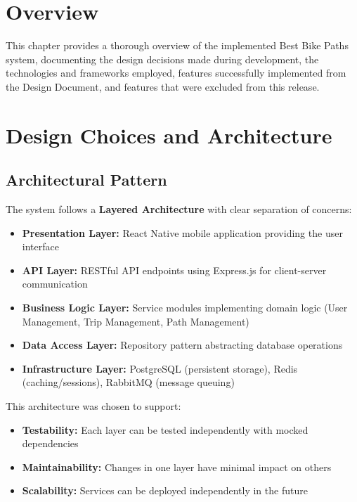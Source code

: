 \section{Overview}
\label{sec:system_implementation_overview}

This chapter provides a thorough overview of the implemented Best Bike Paths system, documenting the design decisions made during development, the technologies and frameworks employed, features successfully implemented from the Design Document, and features that were excluded from this release.

\section{Design Choices and Architecture}
\label{sec:design_choices}

\subsection{Architectural Pattern}
\label{subsec:architectural_pattern}

The system follows a \textbf{Layered Architecture} with clear separation of concerns:

\begin{itemize}
    \item \textbf{Presentation Layer:} React Native mobile application providing the user interface
    \item \textbf{API Layer:} RESTful API endpoints using Express.js for client-server communication
    \item \textbf{Business Logic Layer:} Service modules implementing domain logic (User Management, Trip Management, Path Management)
    \item \textbf{Data Access Layer:} Repository pattern abstracting database operations
    \item \textbf{Infrastructure Layer:} PostgreSQL (persistent storage), Redis (caching/sessions), RabbitMQ (message queuing)
\end{itemize}

This architecture was chosen to support:
\begin{itemize}
    \item \textbf{Testability:} Each layer can be tested independently with mocked dependencies
    \item \textbf{Maintainability:} Changes in one layer have minimal impact on others
    \item \textbf{Scalability:} Services can be deployed independently in the future
\end{itemize}

